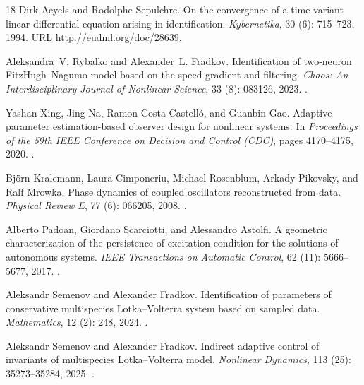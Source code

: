 \documentclass[11pt]{article}
\theoremstyle{thmstyleone}
\theoremstyle{thmstyletwo}
\theoremstyle{thmstylethree}
\begin{document}
\begin{thebibliography}{18}
Dirk Aeyels and Rodolphe Sepulchre.
\newblock On the convergence of a time-variant linear differential equation arising in identification.
\newblock \emph{Kybernetika}, 30 (6): 715--723, 1994.
\newblock URL \url{http://eudml.org/doc/28639}.

Aleksandra~V. Rybalko and Alexander~L. Fradkov.
\newblock Identification of two-neuron {FitzHugh--Nagumo} model based on the speed-gradient and filtering.
\newblock \emph{Chaos: An Interdisciplinary Journal of Nonlinear Science}, 33 (8): 083126, 2023.
\newblock {}.

Yashan Xing, Jing Na, Ramon Costa-Castell{\'o}, and Guanbin Gao.
\newblock Adaptive parameter estimation-based observer design for nonlinear systems.
\newblock In \emph{Proceedings of the 59th IEEE Conference on Decision and Control (CDC)}, pages 4170--4175, 2020.
\newblock {}.

Bj{\"o}rn Kralemann, Laura Cimponeriu, Michael Rosenblum, Arkady Pikovsky, and Ralf Mrowka.
\newblock Phase dynamics of coupled oscillators reconstructed from data.
\newblock \emph{Physical Review E}, 77 (6): 066205, 2008.
\newblock {}.

Alberto Padoan, Giordano Scarciotti, and Alessandro Astolfi.
\newblock A geometric characterization of the persistence of excitation condition for the solutions of autonomous systems.
\newblock \emph{IEEE Transactions on Automatic Control}, 62 (11): 5666--5677, 2017.
\newblock {}.

Aleksandr Semenov and Alexander Fradkov.
\newblock Identification of parameters of conservative multispecies {Lotka--Volterra} system based on sampled data.
\newblock \emph{Mathematics}, 12 (2): 248, 2024.
\newblock {}.

Aleksandr Semenov and Alexander Fradkov.
\newblock Indirect adaptive control of invariants of multispecies {Lotka--Volterra} model.
\newblock \emph{Nonlinear Dynamics}, 113 (25): 35273--35284, 2025.
\newblock {}.


\end{thebibliography}
\end{document}
